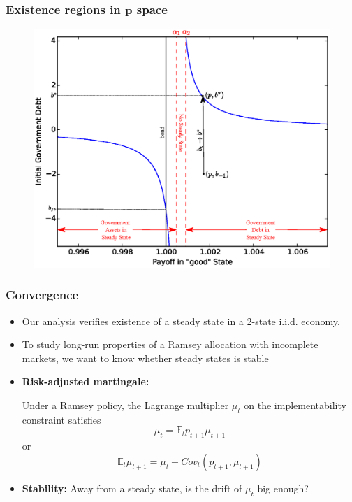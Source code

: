 \documentclass{beamer}
\newcommand{\EE}{\mathbb E}
\begin{document}
\begin{frame}
   \frametitle{Existence regions in $\bm{p}$ space}
	\begin{figure}
		\begin{center}
		\includegraphics[scale=.5]{Images/graph_nostable.eps}
	\end{center}	
	\end{figure}

  \end{frame}


 \begin{frame}
  \frametitle{Convergence}
  \begin{itemize}
		\item Our analysis verifies existence of a steady state in a 2-state i.i.d. economy.
		\item To study long-run properties of a Ramsey allocation with incomplete markets, we want to know whether steady states is stable
		\item \textbf{Risk-adjusted martingale:}
		
		Under a Ramsey policy, the Lagrange multiplier $\mu_t$ on the implementability  constraint   satisfies
		\[
			\mu_t = \EE_t p_{t+1} \mu_{t+1}
		\] or
		\[
		\EE_t  \mu_{t+1}	= \mu_t -Cov_t (p_{t+1}, \mu_{t+1})
		\]
	
		\item \textbf{Stability: }   Away from a steady state, is the drift  of $\mu_t$ big enough?
		\end{itemize}
	

  \end{frame}
\end{document}
